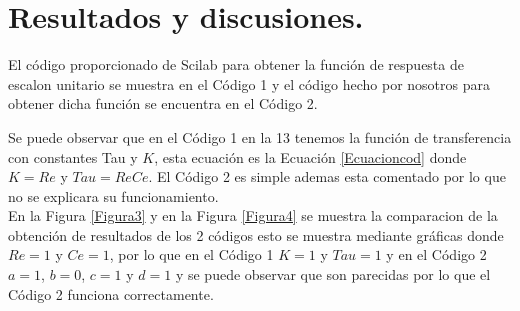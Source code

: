 \documentclass[12pt,a4paper]{article}
\begin{document}
\section{Resultados y discusiones.}
El código proporcionado de Scilab para obtener la función de respuesta de escalon unitario se muestra en el Código 1 y el código hecho por nosotros para obtener dicha función se encuentra en el Código 2.
\begin{center}

\end{center}
\begin{center}

\end{center}
Se puede observar que en el Código 1 en la 13 tenemos la función de transferencia con constantes Tau y $K$, esta ecuación es la Ecuación \ref{Ecuacioncod} donde $K = Re$ y $Tau = ReCe$. El Código 2 es simple ademas esta comentado por lo que no se explicara su funcionamiento.\\[12pt]
En la Figura \ref{Figura3} y en la Figura \ref{Figura4} se muestra la comparacion de la obtención de resultados de los 2 códigos esto se muestra mediante gráficas donde $Re = 1$ y $Ce=1$, por lo que en el Código 1 $K = 1$ y $Tau = 1$ y en el Código 2 $a = 1$, $b = 0$, $c = 1$ y $d = 1$ y se puede observar que son parecidas por lo que el Código 2 funciona correctamente.
\end{document}
